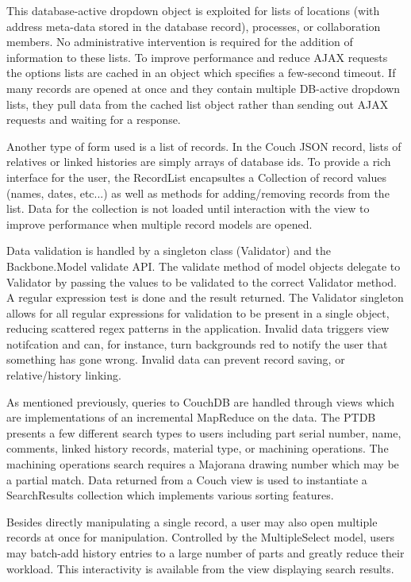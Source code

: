 \documentclass[journal]{IEEEtran}
\begin{document}
This database-active dropdown object is exploited for lists of locations (with address meta-data
stored in the database record), processes, or collaboration members. No administrative intervention
is required for the addition of information to these lists. To improve performance and reduce
AJAX requests the options lists are cached in an object which specifies a few-second timeout.
If many records are opened at once and they contain multiple DB-active dropdown lists, they 
pull data from the cached list object rather than sending out AJAX requests and waiting for 
a response.

Another type of form used is a list of records. 
In the Couch JSON record, lists of relatives or linked histories are simply arrays of database ids. To provide a rich
interface for the user, the RecordList encapsultes a Collection of record values (names, dates, etc...)
as well as methods for adding/removing records from the list. Data for the collection is not loaded
until interaction with the view to improve performance when multiple record models are opened.

Data validation is handled by a singleton class (Validator) and the Backbone.Model validate API. The validate
method of model objects delegate to Validator by passing the values to be validated to the correct
Validator method. A regular expression test is done and the result returned. The Validator singleton
allows for all regular expressions for validation to be present in a single object, reducing scattered
regex patterns in the application. Invalid data triggers view notifcation and can, for instance, turn backgrounds 
red to notify the user that something has gone wrong. Invalid data can prevent record saving, or relative/history linking.

As mentioned previously, queries to CouchDB are handled through views which are implementations of an
incremental MapReduce on the data. The PTDB presents a few different search types to users including
part serial number, name, comments, linked history records, material type, or machining operations.
The machining operations search requires a Majorana drawing number which may be a partial match. Data
returned from a Couch view is used to instantiate a SearchResults collection which implements various
sorting features.

Besides directly manipulating a single record, a user may also open multiple records at once for 
manipulation. Controlled by the MultipleSelect model, users may batch-add history entries to a
large number of parts and greatly reduce their workload. This interactivity is available from
the view displaying search results.
\end{document}
